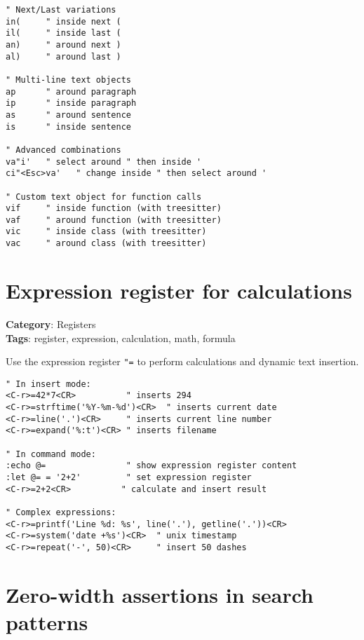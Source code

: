 {\begin{Exa*}{}
\begin{Verbatim}[fontsize=\footnotesize, breaklines, breakanywhere]
" Next/Last variations
in(     " inside next (
il(     " inside last (
an)     " around next )
al)     " around last )

" Multi-line text objects
ap      " around paragraph
ip      " inside paragraph
as      " around sentence
is      " inside sentence

" Advanced combinations
va"i'   " select around " then inside '
ci"<Esc>va'   " change inside " then select around '

" Custom text object for function calls
vif     " inside function (with treesitter)
vaf     " around function (with treesitter)
vic     " inside class (with treesitter)
vac     " around class (with treesitter)
\end{Verbatim}
\end{Exa*}

\section{Expression register for calculations}

\textbf{Category}: Registers\\ \textbf{Tags}: register, expression, calculation, math, formula
\vspace{0.5cm}

Use the expression register {\footnotesize \Verb§"=§} to perform calculations and dynamic text insertion.

\begin{Exa*}{}
\begin{Verbatim}[fontsize=\footnotesize, breaklines, breakanywhere]
" In insert mode:
<C-r>=42*7<CR>          " inserts 294
<C-r>=strftime('%Y-%m-%d')<CR>  " inserts current date
<C-r>=line('.')<CR>     " inserts current line number
<C-r>=expand('%:t')<CR> " inserts filename

" In command mode:
:echo @=                " show expression register content
:let @= = '2+2'         " set expression register
<C-r>=2+2<CR>          " calculate and insert result

" Complex expressions:
<C-r>=printf('Line %d: %s', line('.'), getline('.'))<CR>
<C-r>=system('date +%s')<CR>  " unix timestamp
<C-r>=repeat('-', 50)<CR>     " insert 50 dashes
\end{Verbatim}
\end{Exa*}

\section{Zero-width assertions in search patterns}

}
